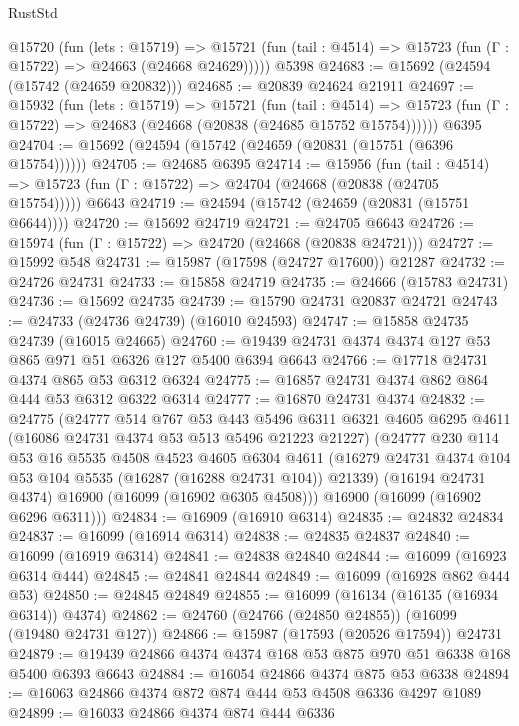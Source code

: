 \begin{lexlean}{RustStd}
\begin{coremodule}
    @15720
      (fun (lets : @15719) =>
      @15721 (fun (tail : @4514) => @15723 (fun (Γ : @15722) => @24663 (@24668 @24629)))))
    @5398
@24683 := @15692 (@24594 (@15742 (@24659 @20832)))
@24685 := @20839 @24624 @21911
@24697 := @15932
    (fun (lets : @15719) =>
    @15721
      (fun (tail : @4514) =>
      @15723 (fun (Γ : @15722) => @24683 (@24668 (@20838 (@24685 @15752 @15754))))))
    @6395
@24704 := @15692 (@24594 (@15742 (@24659 (@20831 (@15751 (@6396 @15754))))))
@24705 := @24685 @6395
@24714 := @15956
    (fun (tail : @4514) => @15723 (fun (Γ : @15722) => @24704 (@24668 (@20838 (@24705 @15754)))))
    @6643
@24719 := @24594 (@15742 (@24659 (@20831 (@15751 @6644))))
@24720 := @15692 @24719
@24721 := @24705 @6643
@24726 := @15974 (fun (Γ : @15722) => @24720 (@24668 (@20838 @24721)))
@24727 := @15992 @548
@24731 := @15987 (@17598 (@24727 @17600)) @21287
@24732 := @24726 @24731
@24733 := @15858 @24719
@24735 := @24666 (@15783 @24731)
@24736 := @15692 @24735
@24739 := @15790 @24731 @20837 @24721
@24743 := @24733 (@24736 @24739) (@16010 @24593)
@24747 := @15858 @24735 @24739 (@16015 @24665)
@24760 := @19439 @24731 @4374 @4374 @127 @53 @865 @971 @51 @6326 @127 @5400 @6394 @6643
@24766 := @17718 @24731 @4374 @865 @53 @6312 @6324
@24775 := @16857 @24731 @4374 @862 @864 @444 @53 @6312 @6322 @6314
@24777 := @16870 @24731 @4374
@24832 := @24775
    (@24777
      @514
      @767
      @53
      @443
      @5496
      @6311
      @6321
      @4605
      @6295
      @4611
      (@16086 @24731 @4374 @53 @513 @5496 @21223 @21227)
      (@24777
        @230
        @114
        @53
        @16
        @5535
        @4508
        @4523
        @4605
        @6304
        @4611
        (@16279 @24731 @4374 @104 @53 @104 @5535 (@16287 (@16288 @24731 @104)) @21339)
        (@16194 @24731 @4374)
        @16900
        (@16099 (@16902 @6305 @4508)))
      @16900
      (@16099 (@16902 @6296 @6311)))
@24834 := @16909 (@16910 @6314)
@24835 := @24832 @24834
@24837 := @16099 (@16914 @6314)
@24838 := @24835 @24837
@24840 := @16099 (@16919 @6314)
@24841 := @24838 @24840
@24844 := @16099 (@16923 @6314 @444)
@24845 := @24841 @24844
@24849 := @16099 (@16928 @862 @444 @53)
@24850 := @24845 @24849
@24855 := @16099 (@16134 (@16135 (@16934 @6314)) @4374)
@24862 := @24760 (@24766 (@24850 @24855)) (@16099 (@19480 @24731 @127))
@24866 := @15987 (@17593 (@20526 @17594)) @24731
@24879 := @19439 @24866 @4374 @4374 @168 @53 @875 @970 @51 @6338 @168 @5400 @6393 @6643
@24884 := @16054 @24866 @4374 @875 @53 @6338
@24894 := @16063 @24866 @4374 @872 @874 @444 @53 @4508 @6336 @4297 @1089
@24899 := @16033 @24866 @4374 @874 @444 @6336

\end{coremodule}
\end{lexlean}
